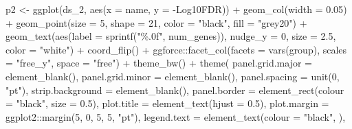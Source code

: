 \documentclass[
  11pt,
  oneside]{book}
\newenvironment{Shaded}{\begin{snugshade}}{\end{snugshade}}
\newcommand{\AttributeTok}[1]{\textcolor[rgb]{0.77,0.63,0.00}{#1}}
\newcommand{\DecValTok}[1]{\textcolor[rgb]{0.00,0.00,0.81}{#1}}
\newcommand{\FloatTok}[1]{\textcolor[rgb]{0.00,0.00,0.81}{#1}}
\newcommand{\FunctionTok}[1]{\textcolor[rgb]{0.00,0.00,0.00}{#1}}
\newcommand{\NormalTok}[1]{#1}
\newcommand{\OtherTok}[1]{\textcolor[rgb]{0.56,0.35,0.01}{#1}}
\newcommand{\SpecialCharTok}[1]{\textcolor[rgb]{0.00,0.00,0.00}{#1}}
\newcommand{\StringTok}[1]{\textcolor[rgb]{0.31,0.60,0.02}{#1}}
\begin{document}
\begin{Shaded}
\begin{Highlighting}[]
\NormalTok{p2 }\OtherTok{\textless{}{-}} \FunctionTok{ggplot}\NormalTok{(ds\_2, }\FunctionTok{aes}\NormalTok{(}\AttributeTok{x =}\NormalTok{ name, }\AttributeTok{y =} \StringTok{\textasciigrave{}}\AttributeTok{{-}Log10FDR}\StringTok{\textasciigrave{}}\NormalTok{)) }\SpecialCharTok{+}
  \FunctionTok{geom\_col}\NormalTok{(}\AttributeTok{width =} \FloatTok{0.05}\NormalTok{) }\SpecialCharTok{+}
  \FunctionTok{geom\_point}\NormalTok{(}\AttributeTok{size =} \DecValTok{5}\NormalTok{, }\AttributeTok{shape =} \DecValTok{21}\NormalTok{, }\AttributeTok{color =} \StringTok{"black"}\NormalTok{, }\AttributeTok{fill =} \StringTok{"grey20"}\NormalTok{) }\SpecialCharTok{+}
  \FunctionTok{geom\_text}\NormalTok{(}\FunctionTok{aes}\NormalTok{(}\AttributeTok{label =} \FunctionTok{sprintf}\NormalTok{(}\StringTok{"\%.0f"}\NormalTok{, num\_genes)), }\AttributeTok{nudge\_y =} \DecValTok{0}\NormalTok{, }\AttributeTok{size =} \FloatTok{2.5}\NormalTok{, }\AttributeTok{color =} \StringTok{"white"}\NormalTok{) }\SpecialCharTok{+}
  \FunctionTok{coord\_flip}\NormalTok{() }\SpecialCharTok{+}
\NormalTok{  ggforce}\SpecialCharTok{::}\FunctionTok{facet\_col}\NormalTok{(}\AttributeTok{facets =} \FunctionTok{vars}\NormalTok{(group), }\AttributeTok{scales =} \StringTok{"free\_y"}\NormalTok{, }\AttributeTok{space =} \StringTok{"free"}\NormalTok{) }\SpecialCharTok{+}
  \FunctionTok{theme\_bw}\NormalTok{() }\SpecialCharTok{+}
  \FunctionTok{theme}\NormalTok{(}
    \AttributeTok{panel.grid.major =} \FunctionTok{element\_blank}\NormalTok{(),}
    \AttributeTok{panel.grid.minor =} \FunctionTok{element\_blank}\NormalTok{(),}
    \AttributeTok{panel.spacing =} \FunctionTok{unit}\NormalTok{(}\DecValTok{0}\NormalTok{, }\StringTok{"pt"}\NormalTok{),}
    \AttributeTok{strip.background =} \FunctionTok{element\_blank}\NormalTok{(),}
    \AttributeTok{panel.border =} \FunctionTok{element\_rect}\NormalTok{(}\AttributeTok{colour =} \StringTok{"black"}\NormalTok{, }\AttributeTok{size =} \FloatTok{0.5}\NormalTok{),}
    \AttributeTok{plot.title =} \FunctionTok{element\_text}\NormalTok{(}\AttributeTok{hjust =} \FloatTok{0.5}\NormalTok{),}
    \AttributeTok{plot.margin =}\NormalTok{ ggplot2}\SpecialCharTok{::}\FunctionTok{margin}\NormalTok{(}\DecValTok{5}\NormalTok{, }\DecValTok{0}\NormalTok{, }\DecValTok{5}\NormalTok{, }\DecValTok{5}\NormalTok{, }\StringTok{"pt"}\NormalTok{),}
    \AttributeTok{legend.text =} \FunctionTok{element\_text}\NormalTok{(}\AttributeTok{colour =} \StringTok{"black"}\NormalTok{, ),}

\end{Highlighting}
\end{Shaded}
\end{document}
